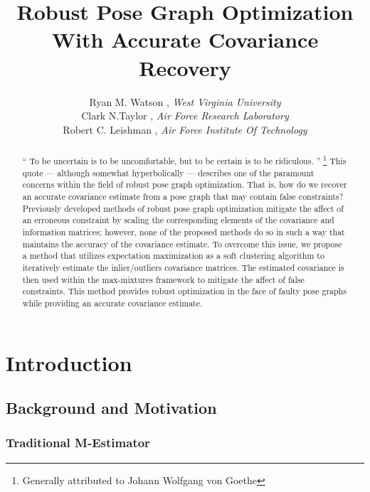 \documentclass{IEEEtran}
\begin{document}
\title{Robust Pose Graph Optimization With Accurate Covariance Recovery \\ }
\author{Ryan M. Watson , { \it West Virginia University} \\   
		Clark N.Taylor , {\it Air Force Research Laboratory} \\ 
	    Robert C. Leishman , {\it Air Force Institute Of Technology} }
\maketitle


\begin{abstract}
 
``	To be uncertain is to be uncomfortable, but to be certain is to be ridiculous. '' \footnote{Generally attributed to Johann Wolfgang von Goethe} This quote ---  although somewhat hyperbolically --- describes one of the paramount concerns within the field of robust pose graph optimization. That is, how do we recover an accurate covariance estimate from a pose graph that may contain false constraints? Previously developed methods of robust pose graph optimization mitigate the affect of an erroneous constraint by scaling the corresponding elements of the covariance and information matrices; however, none of the proposed methods do so in such a way that maintains the accuracy of the covariance estimate. To overcome this issue, we propose a method that utilizes expectation maximization as a soft clustering algorithm to iteratively estimate the inlier/outliers covariance matrices. The estimated covariance is then used within the max-mixtures framework to mitigate the affect of false constraints. This method provides robust optimization in the face of faulty pose graphs while providing an accurate covariance estimate.
 
\end{abstract}

\section{Introduction}

\subsection{Background and Motivation}

	\subsubsection{Traditional M-Estimator}
\end{document}
